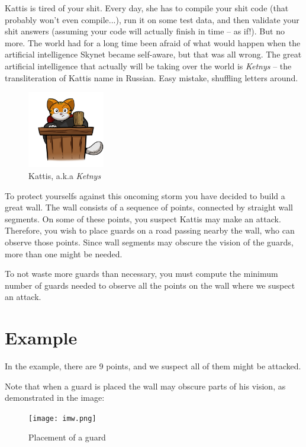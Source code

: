 \newcommand\version{v1}
Kattis is tired of your shit.
Every day, she has to compile your shit code (that probably won't even compile...), run it on some test data, and then validate your shit answers (assuming your code will actually finish in time -- as if!).
But no more.
The world had for a long time been afraid of what would happen when the artificial intelligence Skynet became self-aware, but that was all wrong. The great artificial intelligence that actually will be taking over the world
is \emph{Ketnys} -- the transliteration of Kattis name in Russian. Easy mistake, shuffling letters around.

\begin{figure}[h!]
  \centering
  \includegraphics[width=0.3\textwidth]{kattis.png}
  \caption{Kattis, a.k.a \emph{Ketnys}}
\end{figure}

To protect yourselfs against this oncoming storm you have decided to build a great wall. The wall consists of a sequence of points, connected by straight wall segments.
On some of these points, you suspect Kattis may make an attack. Therefore, you wish to place guards on a road passing nearby the wall, who can observe those points.
Since wall segments may obscure the vision of the guards, more than one might be needed.

To not waste more guards than necessary, you must compute the minimum number of guards needed to observe all the points on the wall where we suspect an attack.

\section*{Example}
In the example, there are 9 points, and we suspect all of them might be attacked.

Note that when a guard is placed the wall may obscure parts of his vision, as demonstrated in the image:
\begin{figure}[h!]
  \centering
  \texttt{[image: imw.png]}
  \caption{Placement of a guard}
\end{figure}

